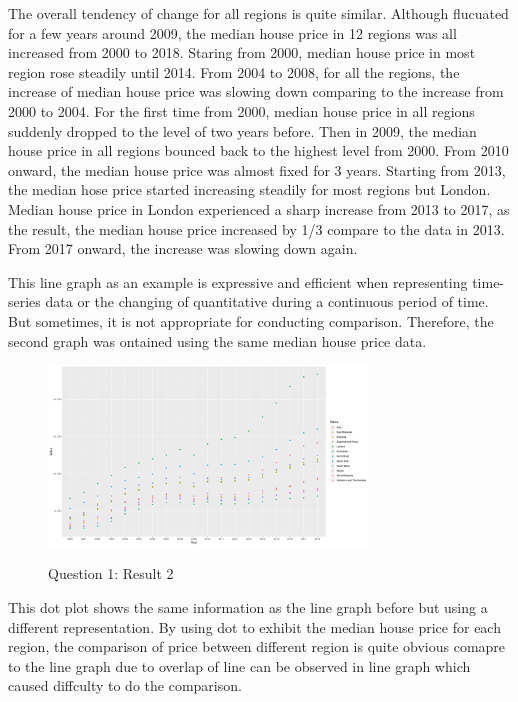 \documentclass{article}
\begin{document}
The overall tendency of change for all regions is quite similar. Although flucuated for a few years around 2009, 
the median house price in 12 regions was all increased from 2000 to 2018. Staring from 2000, median house 
price in most region rose steadily until 2014. From 2004 to 2008, for all the regions, the increase of 
median house price was slowing down comparing to the increase from 2000 to 2004. For the first time from 2000, 
median house price in all regions suddenly dropped to the level of two years before. Then in 2009, the median 
house price in all regions bounced back to the highest level from 2000. From 2010 onward, the median house 
price was almost fixed for 3 years. Starting from 2013, the median hose price started increasing steadily for 
most regions but London. Median house price in London experienced a sharp increase from 2013 to 2017, 
as the result, the median house price increased by 1/3 compare to the data in 2013. From 2017 onward, 
the increase was slowing down again.

This line graph as an example is expressive and efficient when representing time-series data or the changing 
of quantitative during a continuous period of time. But sometimes, it is not appropriate for conducting 
comparison. Therefore, the second graph was ontained using the same median house price data.

\begin{figure}[H]
  \begin{minipage}[b]{1.0\linewidth}
    \centering
    \centerline{\includegraphics[width=8.5cm]{Q1Geom_point}}
    \centerline{Question 1: Result 2}\medskip
  \end{minipage}
\end{figure}

This dot plot shows the same information as the line graph before but using a different representation. 
By using dot to exhibit the median house price for each region, the comparison of price between different 
region is quite obvious comapre to the line graph due to overlap of line can be observed in line graph 
which caused diffculty to do the comparison.
\end{document}
